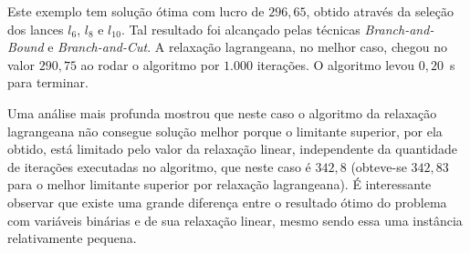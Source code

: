 \documentclass{article}
\begin{document}
    \begin{table}[h]
	    \centering
	   \caption{Leilão de energia elétrica. Na tabela principal, a ocorrência de um valor $1$ entre o lance $l_j$ e o produto $p_i$ significa que $p_i$ é selecionado por $l_j$.
	   A linha de valores especifica o ganho que a seleção de cada lance $l_j$ traz.}
        \label{tab:inst10}
    \end{table}
    
    Este exemplo tem solução ótima com lucro de $ 296{,}65 $, obtido através da seleção dos lances $ l_6 $, $ l_8 $ e $ l_{10} $. Tal resultado foi alcançado pelas técnicas \emph{Branch-and-Bound} e \emph{Branch-and-Cut}. A relaxação lagrangeana, no melhor caso, chegou no valor $ 290{,}75 $ ao rodar o algoritmo por $1.000$ iterações. O algoritmo levou $0{,}20$~s para terminar.
    
    Uma análise mais profunda mostrou que neste caso o algoritmo da relaxação lagrangeana não consegue solução melhor porque o limitante superior, por ela obtido, está limitado pelo valor da relaxação linear, independente da quantidade de iterações executadas no algoritmo, que neste caso é $ 342{,}8 $ (obteve-se $ 342{,}83 $ para o melhor limitante superior por relaxação lagrangeana). É interessante observar que existe uma grande diferença entre o resultado ótimo do problema com variáveis binárias e de sua relaxação linear, mesmo sendo essa uma instância relativamente pequena. 
    
\end{document}
